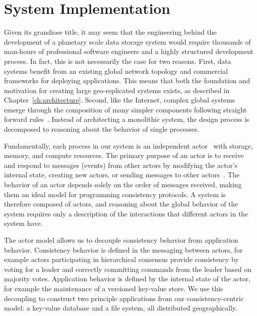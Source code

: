 
\renewcommand{\thechapter}{5}

\chapter{System Implementation}
\label{ch:system_implementation}

Given its grandiose title, it may seem that the engineering behind the development of a planetary scale data storage system would require thousands of man-hours of professional software engineers and a highly structured development process.
In fact, this is not necessarily the case for two reasons.
First, data systems benefit from an existing global network topology and commercial frameworks for deploying applications.
This means that both the foundation and motivation for creating large geo-replicated systems exists, as described in Chapter~\ref{ch:architecture}.
Second, like the Internet, complex global systems emerge through the composition of many simpler components following straight forward rules~\cite{internet}.
Instead of architecting a monolithic system, the design process is decomposed to reasoning about the behavior of single processes.

Fundamentally, each process in our system is an independent actor~\cite{actors,scala_actors,orleans} with storage, memory, and compute resources.
The primary purpose of an actor is to receive and respond to messages (events) from other actors by modifying the actor's internal state, creating new actors, or sending messages to other actors~\cite{hewitt_actors}.
The behavior of an actor depends solely on the order of messages received, making them an ideal model for programming consistency protocols.
A system is therefore composed of actors, and reasoning about the global behavior of the system requires only a description of the interactions that different actors in the system have.

The actor model allows us to decouple consistency behavior from application behavior.
Consistency behavior is defined in the messaging between actors, for example actors participating in hierarchical consensus provide consistency by voting for a leader and correctly committing commands from the leader based on majority votes.
Application behavior is defined by the internal state of the actor, for example the maintenance of a versioned key-value store.
We use this decoupling to construct two principle applications from our consistency-centric model: a key-value database and a file system, all distributed geographically.

